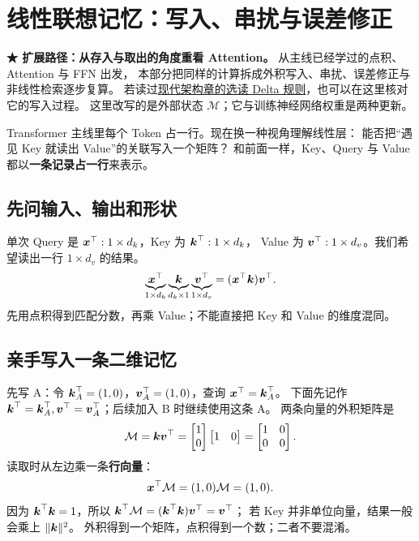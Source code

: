\chapterrule
\section{线性联想记忆：写入、串扰与误差修正}
\label{intro:key-value-outer-product}
\label{intro:delta-memory}

\label{concept:outer-product}

\noindent\textbf{{\symboliconfont ★} 扩展路径：从存入与取出的角度重看 Attention。}
从主线已经学过的点积、Attention 与 FFN 出发，
本部分把同样的计算拆成外积写入、串扰、误差修正与非线性检索逐步复算。
若读过\hyperref[sec:modern-delta-rule]{现代架构章的选读 Delta 规则}，也可以在这里核对它的写入过程。
这里改写的是外部状态 $\mathcal{M}$；它与训练神经网络权重是两种更新。

Transformer 主线里每个 Token 占一行。现在换一种视角理解线性层：
能否把“遇见 Key 就读出 Value”的关联写入一个矩阵？
和前面一样，Key、Query 与 Value 都以\textbf{一条记录占一行}来表示。

\subsection{先问输入、输出和形状}
单次 Query 是 $\boldsymbol{x}^\top:1\times d_k$，Key 为 $\boldsymbol{k}^\top:1\times d_k$，
Value 为 $\boldsymbol{v}^\top:1\times d_v$。我们希望读出一行 $1\times d_v$ 的结果。
\[
\underbrace{\boldsymbol{x}^\top}_{1\times d_k}
\underbrace{\boldsymbol{k}}_{d_k\times1}
\underbrace{\boldsymbol{v}^\top}_{1\times d_v}
=(\boldsymbol{x}^\top\boldsymbol{k})\boldsymbol{v}^\top.
\]
先用点积得到匹配分数，再乘 Value；不能直接把 Key 和 Value 的维度混同。

\subsection{亲手写入一条二维记忆}
先写 A：令 $\boldsymbol{k}_A^\top=(1,0)$，$\boldsymbol{v}_A^\top=(1,0)$，查询 $\boldsymbol{x}^\top=\boldsymbol{k}_A^\top$。
下面先记作 $\boldsymbol{k}^\top=\boldsymbol{k}_A^\top,\boldsymbol{v}^\top=\boldsymbol{v}_A^\top$；后续加入 B 时继续使用这条 A。
两条向量的外积矩阵是
\[
\mathcal{M}=\boldsymbol{k} \boldsymbol{v}^\top
=\begin{bmatrix}1\\0\end{bmatrix}
\begin{bmatrix}1&0\end{bmatrix}
=\begin{bmatrix}1&0\\0&0\end{bmatrix}.
\]
读取时从左边乘一条\textbf{行向量}：
\begin{equation}
\boldsymbol{x}^\top\mathcal{M}=(1,0)\mathcal{M}=(1,0).
\end{equation}
因为 $\boldsymbol{k}^\top\boldsymbol{k}=1$，所以 $\boldsymbol{k}^\top\mathcal{M}=(\boldsymbol{k}^\top\boldsymbol{k})\boldsymbol{v}^\top=\boldsymbol{v}^\top$；
若 Key 并非单位向量，结果一般会乘上 $\|\boldsymbol{k}\|^2$。
外积得到一个矩阵，点积得到一个数；二者不要混淆。

